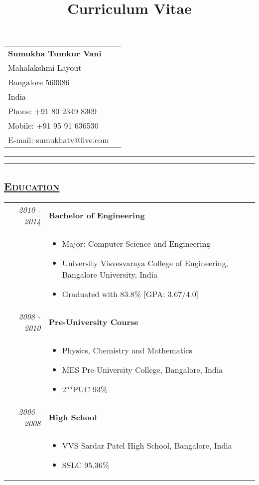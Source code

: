 \documentclass[14pt]{article}
\begin{document}
\title{Curriculum Vitae}

\begin{tabularx}{\textwidth}{l r}
\Huge{\textbf{Sumukha Tumkur Vani}} & 
\large
\begin{tabular}{r}
371, 10$^{th}$ cross\\
Mahalakshmi Layout\\
Bangalore 560086\\
India\\
Phone: +91 80 2349 8309\\
Mobile: +91 95 91 636530\\
E-mail: sumukhatv@live.com
\end{tabular}
\end{tabularx}
\rule{\textwidth}{0pt}
\rule{\textwidth}{0.4pt}

\subsection* {\scshape\LARGE\uline {Education}}
\large

\begin{tabularx}{\textwidth}{r X}
\emph{2010 - 2014} & \textbf{Bachelor of Engineering} \\
		                  & \begin{itemize}[noitemsep,topsep=0pt]
						\item[] Major: Computer Science and Engineering
			                \item[] University Visvesvaraya College of Engineering, Bangalore University, India 
			                \item[] Graduated with 83.8\% [GPA: 3.67/4.0]			    
					     \end{itemize}
\\

\emph{2008 - 2010} & \textbf{Pre-University Course} \\ 
		                  & \begin{itemize}[noitemsep,topsep=0pt]
						\item[] Physics, Chemistry and Mathematics
						\item[] MES Pre-University College, Bangalore, India 
			                \item[] 2$^{nd}$PUC 93\%
						\end{itemize}		    
\\

\emph{2005 - 2008} & \textbf{High School} \\ 
			           & \begin{itemize}[noitemsep,topsep=0pt]
					   \item[] VVS Sardar Patel High School, Bangalore, India 
				        \item[] SSLC 95.36\%
					   \end{itemize}		    
\end{tabularx}
\end{document}
